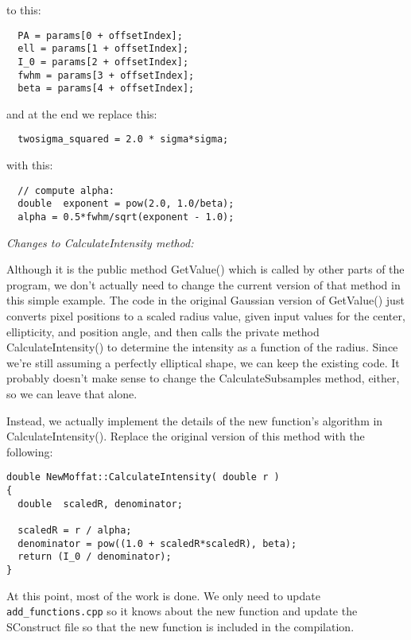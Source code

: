\documentclass[10pt,a4paper,article]{memoir}
\begin{document}
to this:
\begin{verbatim}
  PA = params[0 + offsetIndex];
  ell = params[1 + offsetIndex];
  I_0 = params[2 + offsetIndex];
  fwhm = params[3 + offsetIndex];
  beta = params[4 + offsetIndex];
\end{verbatim}
and at the end we replace this:
\begin{verbatim}
  twosigma_squared = 2.0 * sigma*sigma;
\end{verbatim}
with this:
\begin{verbatim}
  // compute alpha:
  double  exponent = pow(2.0, 1.0/beta);
  alpha = 0.5*fwhm/sqrt(exponent - 1.0);
\end{verbatim}


\bigskip
\noindent \textit{Changes to CalculateIntensity method:}
\smallskip

Although it is the public method GetValue() which is called by other parts of
the program, we don't actually need to change the current version of that method
in this simple example. The code in the original Gaussian version of GetValue()
just converts pixel positions to a scaled radius value, given input values for
the center, ellipticity, and position angle, and then calls the private method
CalculateIntensity() to determine the intensity as a function of the radius.
Since we're still assuming a perfectly elliptical shape, we can keep the
existing code.  It probably doesn't make sense to change the CalculateSubsamples
method, either, so we can leave that alone.

Instead, we actually implement the details of the new function's algorithm in
CalculateIntensity(). Replace the original version of this method with the
following:

\begin{verbatim}
double NewMoffat::CalculateIntensity( double r )
{
  double  scaledR, denominator;
  
  scaledR = r / alpha;
  denominator = pow((1.0 + scaledR*scaledR), beta);
  return (I_0 / denominator);
}
\end{verbatim}

\bigskip


At this point, most of the work is done.  We only need to update
\texttt{add\_functions.cpp} so it knows about the new function and
update the SConstruct file so that the new function is included in the
compilation.
\end{document}
